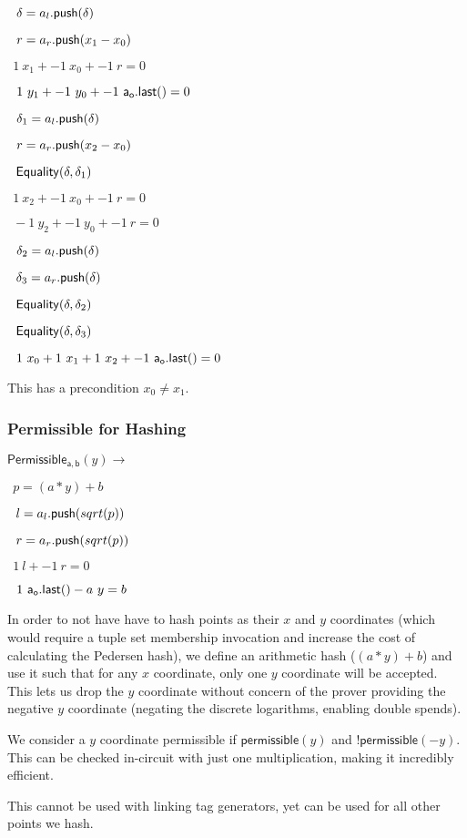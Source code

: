 \documentclass[]{article}
\begin{document}
$~~\delta = a_l\mathsf{.push}(\delta)$

$~~r = a_r\mathsf{.push}(x_1 - x_0)$

$~~1 ~x_1 + -1 ~x_0 + -1 ~r = 0$

$~~1 ~y_1 + -1 ~y_0 + -1 ~\mathsf{a_o.last()} = 0$

$~~\delta_1 = a_l\mathsf{.push}(\delta)$

$~~r = a_r\mathsf{.push}(x_2 - x_0)$

$~~\mathsf{Equality}(\delta, \delta_1)$

$~~1 ~x_2 + -1 ~x_0 + -1 ~r = 0$

$~~-1 ~y_2 + -1 ~y_0 + -1 ~r = 0$

$~~\delta_2 = a_l\mathsf{.push}(\delta)$

$~~\delta_3 = a_r\mathsf{.push}(\delta)$

$~~\mathsf{Equality}(\delta, \delta_2)$

$~~\mathsf{Equality}(\delta, \delta_3)$

$~~1 ~x_0 + 1 ~x_1 + 1 ~x_2 + -1 ~\mathsf{a_o.last()} = 0$

This has a precondition $x_0 \ne x_1$.

\subsubsection{Permissible for Hashing}

\newcommand{\permissible}{\mathsf{Permissible_{a, b}}}

$\permissible(y) \rightarrow$

$~~p = (a * y) + b$

$~~l = a_l\mathsf{.push}(sqrt(p))$

$~~r = a_r\mathsf{.push}(sqrt(p))$

$~~1 ~l + -1 ~r = 0$

$~~1 ~\mathsf{a_o.last()} - a ~y = b$

In order to not have have to hash points as their $x$ and $y$ coordinates (which would require a tuple set membership invocation and increase the cost of calculating the Pedersen hash), we define an arithmetic hash ($(a * y) + b$) and use it such that for any $x$ coordinate, only one $y$ coordinate will be accepted. This lets us drop the $y$ coordinate without concern of the prover providing the negative $y$ coordinate (negating the discrete logarithms, enabling double spends).

We consider a $y$ coordinate permissible if $\mathsf{permissible}(y)$ and $!\mathsf{permissible}(-y)$. This can be checked in-circuit with just one multiplication, making it incredibly efficient.

This cannot be used with linking tag generators, yet can be used for all other points we hash.
\end{document}
